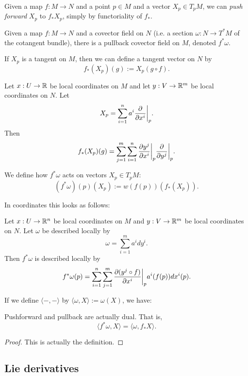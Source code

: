 \documentclass[11pt, english]{article}
\begin{document}
Given a map $f:M \to N$ and a point $p \in M$ and a vector $X_p \in T_pM$, we can \emph{push forward} $X_p$ to $f_\ast X_p$, simply by functoriality of $f_\ast$. 

Given a map $f:M \to N$ and a covector field on $N$ (i.e. a section $\omega:N \to T^\ast M$ of the cotangent bundle), there is a pullback covector field on $M$, denoted $f^\ast \omega$.

\begin{defi}
If $X_p$ is a tangent on $M$, then we can define a tangent vector on $N$ by 
\[
f_\ast (X_p)(g) := X_p(g \circ f).
\]
\end{defi}

\begin{defi}
Let $x:U \to \mathbb{R}$ be local coordinates on $M$ and let $y:V \to \mathbb{R}^m$ be local coordinates on $N$. Let
\[
X_p = \sum_{i=1}^n a^i \restr{\dd{}{x^i}}{p}.
\]
Then
\[
f_\ast(X_p)(g) = \sum_{j=1}^m \sum_{i=1}^n \restr{\dd{y^j}{x^i}}{p} \restr{\dd{}{y^j}}{p}.
\]
\end{defi}

\begin{defi}
We define how $f^\ast \omega$ acts on vectors $X_p \in T_p M$:
\[
(f^\ast \omega)(p)(X_p) := w(f(p))(f_\ast(X_p)).
\]
\end{defi}

In coordinates this looks as follows:
\begin{prop}
Let $x:U \to \mathbb{R}^n$ be local coordinates on $M$ and $y:V \to \mathbb{R}^m$ be local coordinates on $N$. Let $\omega$ be described locally by
\[
\omega = \sum_{i=1}^m a^i dy^i.
\]
Then $f^\ast \omega$ is described locally by
\[
f^\ast \omega(p) = \sum_{i=1}^n \sum_{j=1}^m \restr{\dd{(y^j \circ f)}{x^i}}{p} a^i(f(p)) dx^i(p).
\]
\end{prop}

If we define $\langle -,- \rangle$ by $\langle \omega, X \rangle := \omega(X)$, we have:
\begin{prop}
Pushforward and pullback are actually dual. That is,
\[
\langle f^\ast \omega, X \rangle = \langle \omega, f_\ast X \rangle.
\]
\end{prop}
\begin{proof}
This is actually the definition.
\end{proof}

\subsection{Lie derivatives}
\end{document}
